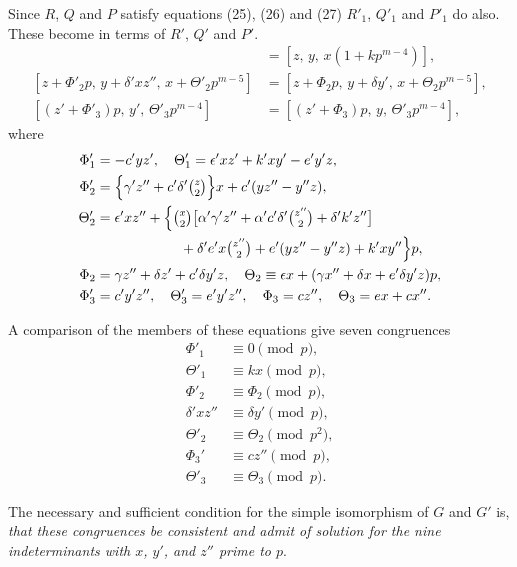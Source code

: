 \documentclass[oneside]{article}
\begin{document}
Since $R$, $Q$ and $P$ satisfy equations (25), (26) and (27) $R'_1$, $Q'_1$
and $P'_1$ do also. These become in terms of $R'$, $Q'$ and $P'$.
\begin{align*}
[z + \Phi'_1 p,\, y,\, x + \Theta'_1 p^{m-4}] &= [z,\, y,\, x(1 + kp^{m-4})], \\
[z + \Phi'_2 p,\, y + \delta'xz'',\, x + \Theta'_2 p^{m-5}] &= [z + \Phi_2 p,\,
  y + \delta y',\, x + \Theta_2 p^{m-5}], \\
[(z' + \Phi'_3)p,\, y',\, \Theta'_3 p^{m-4}] &= [(z' + \Phi_3)p,\, y,\, \Theta'_3 p^{m-4}],
\end{align*}
\noindent where
\begin{align*}
\Phi'_1 &= -c'yz', \quad \Theta'_1 = \epsilon'xz' + k'xy' - e'y'z, \\
\Phi'_2 &= \Bigl\{\gamma'z'' + c'\delta'\tbinom{z}{2}\Bigr\}x + c'(yz'' - y''z), \\
\Theta'_2 &= \epsilon'xz'' + \Bigl\{\tbinom{x}{2}\bigl[\alpha'\gamma'z''
     + \alpha'c'\delta'\tbinom{z''}{2} + \delta'k'z''\bigr] \\
  & \qquad \qquad \qquad + \delta'e'x \tbinom{z''}{2} + e'(yz'' - y''z) + k'xy''\Bigr\}p, \\
\Phi_2 &= \gamma z'' + \delta z' + c'\delta y'z, \quad \Theta_2 \equiv
  \epsilon x + (\gamma x'' + \delta x + e'\delta y'z)p, \\
\Phi'_3 &= c'y'z'', \quad \Theta'_3 = e'y'z'', \quad \Phi_3 = cz'', \quad
  \Theta_3 = ex + cx''.
\end{align*}

A comparison of the members of these equations give seven congruences
\begin{align*}
\Phi'_1     &\equiv 0         \pmod{p},   \tag{I} \\
\Theta'_1   &\equiv kx        \pmod{p},   \tag{II} \\
\Phi'_2     &\equiv \Phi_2    \pmod{p},   \tag{III} \\
\delta'xz'' &\equiv \delta y' \pmod{p},   \tag{IV} \\
\Theta'_2   &\equiv \Theta_2  \pmod{p^2}, \tag{V} \\
\Phi_3'     &\equiv cz''      \pmod{p},   \tag{VI} \\
\Theta'_3   &\equiv \Theta_3  \pmod{p}.   \tag{VII}
\end{align*}

The necessary and sufficient condition for the simple isomorphism of $G$
and $G'$ is, \textit{that these congruences be consistent and admit of solution
for the nine indeterminants with $x$, $y'$, and $z''$ prime to $p$}.
\end{document}
